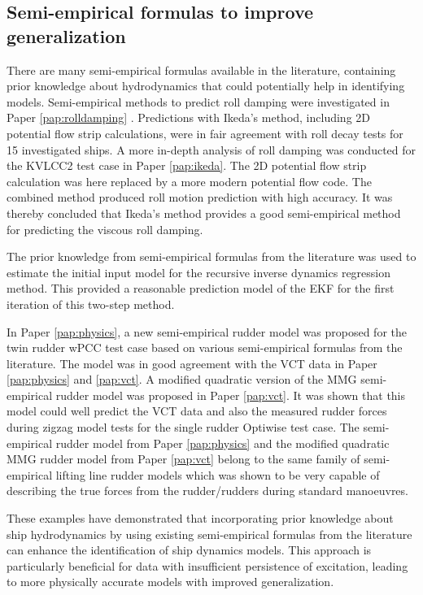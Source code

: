 \subsection*{Semi-empirical formulas to improve generalization}
There are many semi-empirical formulas available in the literature, containing prior knowledge about hydrodynamics that could potentially help in identifying models.       
Semi-empirical methods to predict roll damping were investigated in Paper \ref{pap:rolldamping} . Predictions with Ikeda's method, including 2D potential flow strip calculations, were in fair agreement with roll decay tests for 15 investigated ships. 
A more in-depth analysis of roll damping was conducted for the KVLCC2 test case in Paper \ref{pap:ikeda}. The 2D potential flow strip calculation was here replaced by a more modern potential flow code. The combined method produced roll motion prediction with high accuracy. It was thereby concluded that Ikeda's method provides a good semi-empirical method for predicting the viscous roll damping.

The prior knowledge from semi-empirical formulas from the literature was used to estimate the initial input model for the recursive inverse dynamics regression method. This provided a reasonable prediction model of the EKF for the first iteration of this two-step method.

In Paper \ref{pap:physics}, a new semi-empirical rudder model was proposed for the twin rudder wPCC test case based on various semi-empirical formulas from the literature. The model was in good agreement with the VCT data in Paper \ref{pap:physics} and \ref{pap:vct}. 
A modified quadratic version of the MMG semi-empirical rudder model was proposed in Paper \ref{pap:vct}. 
It was shown that this model could well predict the VCT data and also the measured rudder forces during zigzag model tests for the single rudder Optiwise test case. 
The semi-empirical rudder model from Paper \ref{pap:physics} and the modified quadratic MMG rudder model from Paper \ref{pap:vct} belong to the same family of semi-empirical lifting line rudder models which was shown to be very capable of describing the true forces from the rudder/rudders during standard manoeuvres. 

These examples have demonstrated that incorporating prior knowledge about ship hydrodynamics by using existing semi-empirical formulas from the literature can enhance the identification of ship dynamics models. This approach is particularly beneficial for data with insufficient persistence of excitation, leading to more physically accurate models with improved generalization. 

